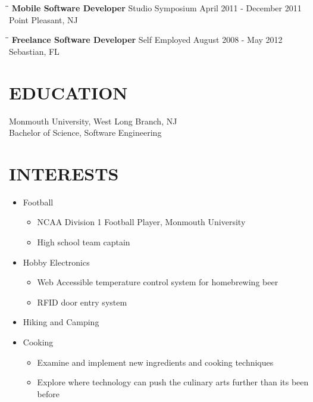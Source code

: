 \documentclass{res}
\begin{document}
\begin{resume}
   \begin{tabbing}
   \hspace{2.3in}\= \hspace{2.6in}\= \kill %
    {\bf Mobile Software Developer} \>Studio Symposium     \>April 2011 - December 2011\\
                             \>Point Pleasant, NJ
   \end{tabbing}\vspace{-20pt}      %

   \begin{tabbing}
   \hspace{2.3in}\= \hspace{2.6in}\= \kill %
    {\bf Freelance Software Developer} \>Self Employed  \>August 2008 - May 2012\\
                             \>Sebastian, FL
   \end{tabbing}\vspace{-20pt}      %

\section{EDUCATION}
    Monmouth University, West Long Branch, NJ  \\
    Bachelor of Science, Software Engineering   \\


\section{INTERESTS}
    \begin{itemize}
        \item Football
            \begin{itemize}
                \item NCAA Division 1 Football Player, Monmouth University
                \item High school team captain
            \end{itemize}
        \item Hobby Electronics
            \begin{itemize}
                \item Web Accessible temperature control system for homebrewing beer
                \item RFID door entry system
            \end{itemize}
        \item Hiking and Camping
        \item Cooking
          \begin{itemize}
            \item Examine and implement new ingredients and cooking techniques
            \item Explore where technology can push the culinary arts further than its been before
          \end{itemize}
    \end{itemize}



\end{resume}
\end{document}
